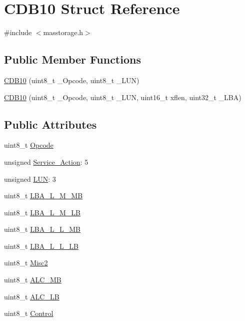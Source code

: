 \hypertarget{struct_c_d_b10}{\section{\-C\-D\-B10 \-Struct \-Reference}
\label{struct_c_d_b10}
}


{\ttfamily \#include $<$masstorage.\-h$>$}

\subsection*{\-Public \-Member \-Functions}
\begin{DoxyCompactItemize}
\item 
\hyperlink{struct_c_d_b10_abd4957a41f650b096987db5963efb674}{\-C\-D\-B10} (uint8\-\_\-t \-\_\-\-Opcode, uint8\-\_\-t \-\_\-\-L\-U\-N)
\item 
\hyperlink{struct_c_d_b10_ae6b8b5161b2e7971603589c35a27c586}{\-C\-D\-B10} (uint8\-\_\-t \-\_\-\-Opcode, uint8\-\_\-t \-\_\-\-L\-U\-N, uint16\-\_\-t xflen, uint32\-\_\-t \-\_\-\-L\-B\-A)
\end{DoxyCompactItemize}
\subsection*{\-Public \-Attributes}
\begin{DoxyCompactItemize}
\item 
uint8\-\_\-t \hyperlink{struct_c_d_b10_af18bbff0fec1a1d31c741c542f2e92d6}{\-Opcode}
\item 
unsigned \hyperlink{struct_c_d_b10_af1cd479d32aae0c581b735eb5aa081bc}{\-Service\-\_\-\-Action}\-: 5
\item 
unsigned \hyperlink{struct_c_d_b10_a451be0bca5ee00395c3f6c6993ac384a}{\-L\-U\-N}\-: 3
\item 
uint8\-\_\-t \hyperlink{struct_c_d_b10_ae954128996312f8c1ac3ef9982dfb033}{\-L\-B\-A\-\_\-\-L\-\_\-\-M\-\_\-\-M\-B}
\item 
uint8\-\_\-t \hyperlink{struct_c_d_b10_aa74c5c59a4bdfeb2aa6e8c163f1fae10}{\-L\-B\-A\-\_\-\-L\-\_\-\-M\-\_\-\-L\-B}
\item 
uint8\-\_\-t \hyperlink{struct_c_d_b10_a82b8e9bddbdbc8ef4d8b19017743f4a9}{\-L\-B\-A\-\_\-\-L\-\_\-\-L\-\_\-\-M\-B}
\item 
uint8\-\_\-t \hyperlink{struct_c_d_b10_a87dd0f57fdaedb842f4c7db9b3f7cb2e}{\-L\-B\-A\-\_\-\-L\-\_\-\-L\-\_\-\-L\-B}
\item 
uint8\-\_\-t \hyperlink{struct_c_d_b10_a26b2c33b7867c33d19e77c6d873d7924}{\-Misc2}
\item 
uint8\-\_\-t \hyperlink{struct_c_d_b10_a31ae08f4bd0767c4fdb070c4c3f64212}{\-A\-L\-C\-\_\-\-M\-B}
\item 
uint8\-\_\-t \hyperlink{struct_c_d_b10_a5115777023c2a37ed50b81db126f648c}{\-A\-L\-C\-\_\-\-L\-B}
\item 
uint8\-\_\-t \hyperlink{struct_c_d_b10_aa39a2ed8852448c4bcbba7d3bc478be5}{\-Control}
\end{DoxyCompactItemize}


